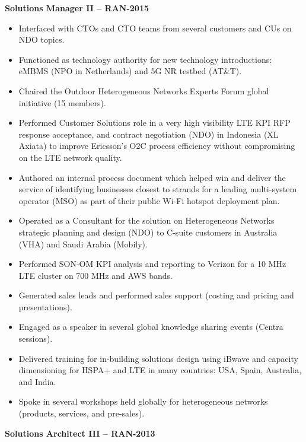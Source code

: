 \documentclass{article}
\begin{document}
\textbf{Solutions Manager II -- RAN\hfill{}-2015}
\begin{itemize}
\item Interfaced with CTOs and CTO teams from several customers and CUs on NDO topics. 
\item Functioned as technology authority for new technology introductions: eMBMS (NPO in Netherlands) and 5G NR testbed (AT\&T). 
\item Chaired the Outdoor Heterogeneous Networks Experts Forum global initiative (15 members). 
\item Performed Customer Solutions role in a very high visibility LTE KPI RFP response acceptance, and contract negotiation (NDO) in Indonesia (XL Axiata) to improve Ericsson's O2C process efficiency without compromising on the LTE network quality. 
\item Authored an internal process document which helped win and deliver the service of identifying businesses closest to strands for a leading multi-system operator (MSO) as part of their public Wi-Fi hotspot deployment plan. 
\item Operated as a Consultant for the solution on Heterogeneous Networks strategic planning and design (NDO) to C-suite customers in Australia (VHA) and Saudi Arabia (Mobily). 
\item Performed SON-OM KPI analysis and reporting to Verizon for a 10 MHz LTE cluster on 700 MHz and AWS bands. 
\item Generated sales leads and performed sales support (costing and pricing and presentations). 
\item Engaged as a speaker in several global knowledge sharing events (Centra sessions). 
\item Delivered training for in-building solutions design using iBwave and capacity dimensioning for HSPA+ and LTE in many countries: USA, Spain, Australia, and India. 
\item Spoke in several workshops held globally for heterogeneous networks (products, services, and pre-sales). 
\end{itemize}
\textbf{Solutions Architect III -- RAN\hfill{}-2013}
\end{document}

